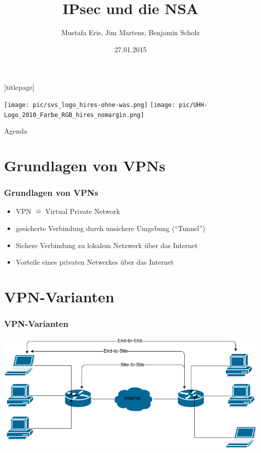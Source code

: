 \documentclass[t]{beamer}
\title{IPsec und die NSA}
\author[Eris, Martens, Scholz]{Mustafa Eris, Jim Martens, Benjamin Scholz}
\institute[Uni Hamburg]{Universität Hamburg\\ Fachbereich Informatik}
\date{27.01.2015}
\begin{document}
\begingroup
	[titlepage]
	\begin{frame}[plain]
		\vskip8mm
		\texttt{[image: pic/svs\_logo\_hires-ohne-was.png]}
		\vskip-20mm %
		\titlepage
		\vspace{\fill}
		\texttt{[image: pic/UHH-Logo\_2010\_Farbe\_RGB\_hires\_nomargin.png]}
		\vskip20pt
	\end{frame}
\endgroup

\begin{frame}{Agenda}
	\tableofcontents
\end{frame}

\section{Grundlagen von VPNs}
\begin{frame}
	\frametitle{Grundlagen von VPNs}
	\begin{itemize}
		\vfill
		\item VPN \(\widehat{=}\) Virtual Private Network
		\vfill
		\item gesicherte Verbindung durch unsichere Umgebung ("`Tunnel"')
		\vfill
		\item Sichere Verbindung zu lokalem Netzwerk über das Internet
		\vfill
		\item Vorteile eines privaten Netwerkes über das Internet
		\vfill
	\end{itemize}
\end{frame}

\section{VPN-Varianten}
\begin{frame}
	\frametitle{VPN-Varianten}
	\vfill
	\includegraphics[width=1\textwidth]{pic/ipsec.png}
\end{frame}
\end{document}
